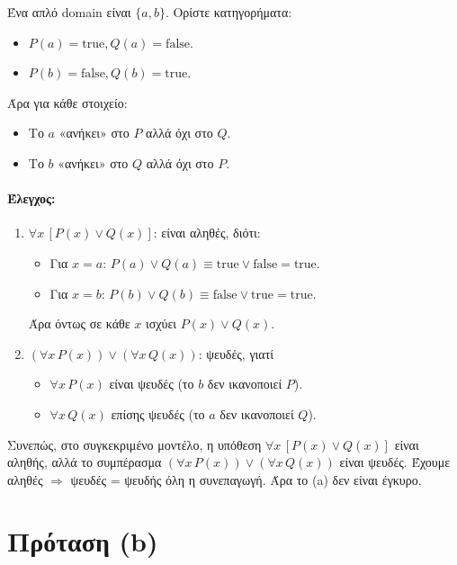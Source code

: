 \documentclass[a4paper,12pt]{article}
\begin{document}
Ένα απλό domain είναι \(\{a, b\}\). Ορίστε κατηγορήματα:
\begin{itemize}
    \item \(P(a)=\text{true}, Q(a)=\text{false}\).
    \item \(P(b)=\text{false}, Q(b)=\text{true}\).
\end{itemize}

Άρα για κάθε στοιχείο:
\begin{itemize}
    \item Το \(a\) «ανήκει» στο \(P\) αλλά όχι στο \(Q\).
    \item Το \(b\) «ανήκει» στο \(Q\) αλλά όχι στο \(P\).
\end{itemize}

\paragraph{Έλεγχος:}
\begin{enumerate}
    \item \(\forall x\,[P(x)\lor Q(x)]\): είναι αληθές, διότι:
    \begin{itemize}
        \item Για \(x=a\): \(P(a)\lor Q(a)\equiv \text{true}\lor\text{false}=\text{true}\).
        \item Για \(x=b\): \(P(b)\lor Q(b)\equiv \text{false}\lor\text{true}=\text{true}\).
    \end{itemize}
    Άρα όντως σε κάθε \(x\) ισχύει \(P(x)\lor Q(x)\).
    \item \((\forall x\,P(x))\lor(\forall x\,Q(x))\): ψευδές, γιατί
    \begin{itemize}
        \item \(\forall x\,P(x)\) είναι ψευδές (το \(b\) δεν ικανοποιεί \(P\)).
        \item \(\forall x\,Q(x)\) επίσης ψευδές (το \(a\) δεν ικανοποιεί \(Q\)).
    \end{itemize}
\end{enumerate}

Συνεπώς, στο συγκεκριμένο μοντέλο, η υπόθεση \(\forall x\,[P(x)\lor Q(x)]\) είναι αληθής, αλλά το συμπέρασμα \((\forall x\,P(x))\lor(\forall x\,Q(x))\) είναι ψευδές. Έχουμε αληθές \(\Rightarrow\) ψευδές = ψευδής όλη η συνεπαγωγή. Άρα το (a) δεν είναι έγκυρο.

\section*{Πρόταση (b)}
\end{document}
